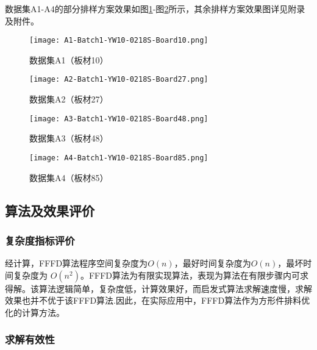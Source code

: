 \documentclass[bwprint]{gmcmthesis}
\begin{document}
        数据集A1-A4的部分排样方案效果如图\ref{效果图1}-图\ref{效果图4}所示，其余排样方案效果图详见附录及附件。

        \begin{figure}[!htbp]
            \centering
            \begin{minipage}{0.48\linewidth}
                \centering
                \texttt{[image: A1-Batch1-YW10-0218S-Board10.png]}
                \caption{数据集A1（板材10）}\label{效果图1}
            \end{minipage}
            \begin{minipage}{0.48\linewidth}
                \centering
                \texttt{[image: A2-Batch1-YW10-0218S-Board27.png]}
                \caption{数据集A2（板材27）}
            \end{minipage}
        \end{figure}
        \begin{figure}[!htbp]
            \centering
            \begin{minipage}{0.48\linewidth}
                \centering
                \texttt{[image: A3-Batch1-YW10-0218S-Board48.png]}
                \caption{数据集A3（板材48）}
            \end{minipage}
            \begin{minipage}{0.48\linewidth}
                \centering
                \texttt{[image: A4-Batch1-YW10-0218S-Board85.png]}
                \caption{数据集A4（板材85）}\label{效果图4}
            \end{minipage}
        \end{figure}
	

\subsection{算法及效果评价}

\subsubsection{复杂度指标评价}  

经计算，FFFD算法程序空间复杂度为$O(n)$，最好时间复杂度为$O(n)$，最坏时间复杂度为 $ O(n^2) $。FFFD算法为有限实现算法，表现为算法在有限步骤内可求得解。该算法逻辑简单，复杂度低，计算效果好，而启发式算法求解速度慢，求解效果也并不优于该FFFD算法.因此，在实际应用中，FFFD算法作为方形件排料优化的计算方法。


\subsubsection{求解有效性}
	
\end{document}
